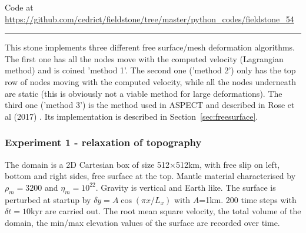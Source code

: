 

\begin{center}
Code at \url{https://github.com/cedrict/fieldstone/tree/master/python_codes/fieldstone_54}
\end{center}

\par\noindent\rule{\textwidth}{0.4pt}



This stone implements three different free surface/mesh deformation algorithms. 
The first one has all the nodes move with the computed velocity (Lagrangian method)
and is coined 'method 1'. 
The second one ('method 2') only has the top row of nodes moving with the computed velocity, 
while all the nodes underneath are static (this is obviously not a viable method for 
large deformations). 
The third one ('method 3') is the method used in ASPECT and described in Rose et al (2017) \cite{robh17}.
Its implementation is described in Section~\ref{sec:freesurface}.

\subsubsection*{Experiment 1 - relaxation of topography}

The domain is a 2D Cartesian box of size 512$\times$512km, with free slip on left, 
bottom and right sides, free surface at the top. 
Mantle material characterised by $\rho_m=3200$ and $\eta_m=10^{22}$. 
Gravity is vertical and Earth like. 
The surface is perturbed at startup by $\delta y = A \cos (\pi x /L_x)$ with $A$=1km.
200 time steps with $\delta t=10$kyr are carried out.
The root mean square velocity, the total volume of the domain, the min/max elevation
values of the surface are recorded over time. 

